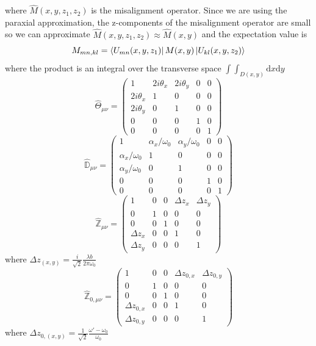 		where $\hat{M}(x,y,z_1,z_2)$ is the misalignment operator.  Since we are using the paraxial approximation, the z-components of the misalignment operator are small so we can approximate $\hat{M}{(x,y,z_1,z_2)} \approx \hat{M}(x,y)$ and the expectation value is
		\begin{equation}
		M_{mn,kl}=  \bra{U_{mn}(x,y,z_1)} M(x,y) \ket{U_{kl}(x,y,z_2)}
		\end{equation}
		where the product is an integral over the transverse space $\int \!\!\! \int_{D(x,y)} \text{d}x \text{d}y$
		\begin{equation} \label{misalign_matrix}
		\hat{\Theta}_{\mu \nu} = 
		\begin{pmatrix}
		   1			&2i\theta_x		&2i\theta_y		& 0 & 0
		\\ 2i\theta_x	&1				&0				& 0	& 0
		\\ 2i\theta_y	&0				&1				& 0	& 0
		\\ 0			&0				&0				& 1	& 0
		\\ 0			&0				&0				& 0	& 1
		\end{pmatrix}
		\end{equation}
		\begin{equation} \label{mistrans_matrix}
		\hat{\mathbb{D}}_{\mu \nu} = 
		\begin{pmatrix}
			1					&\alpha_x/\omega_{0}	&\alpha_y/\omega_{0}	& 0 & 0
		\\ \alpha_x/\omega_{0}	&1						&0						& 0 & 0
		\\ \alpha_y/\omega_{0}	&0						&1						& 0	& 0
		\\ 0					&0						&0						& 1	& 0
		\\ 0					&0						&0						& 0 & 1 
		\end{pmatrix}
		\end{equation}
		\begin{equation} \label{waistloc_matrix}
		\hat{\mathbb{Z}}_{\mu \nu} = 
		\begin{pmatrix}
		1				&0		&0		&\Delta z_x 	&\Delta z_y  
		\\ 0			&1		&0		&0 				&0
		\\ 0			&0		&1		&0 				&0
		\\ \Delta z_x	&0		&0		&1 				&0
		\\ \Delta z_y	&0		&0		&0				&1 
		\end{pmatrix}
		\end{equation}
		where $\Delta z_{(x,y)} =  \frac{i}{\sqrt{2}} \frac{\lambda b}{2\pi\omega_{0}} $
		\begin{equation} \label{waistsize_matrix}
		\hat{\mathbb{Z}}_{0, \mu \nu} = 
		\begin{pmatrix}
		1					&0		&0		&\Delta z_{0,x} 	&\Delta z_{0,y} 
		\\ 0				&1		&0		&0 					&0
		\\ 0				&0		&1		&0 					&0
		\\ \Delta z_{0,x} 	&0		&0		&1 					&0
		\\ \Delta z_{0,y} 	&0		&0		&0					&1 
		\end{pmatrix}
		\end{equation}
		where $\Delta z_{0,(x,y)} =   \frac{1}{\sqrt{2}} \frac{\omega'-\omega_{0}}{\omega_{0}} $
		
